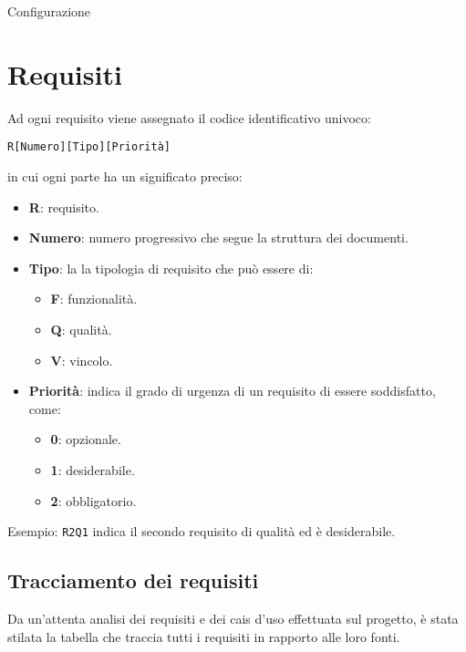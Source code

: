\begin{usecase}{1}{Configurazione}
\label{uc:scenario-principale}
\end{usecase}



\section{Requisiti}
Ad ogni requisito viene assegnato il codice identificativo univoco:
	\begin{center}
		\texttt{R[Numero][Tipo][Priorità]}
	\end{center}
	in cui ogni parte ha un significato preciso:
	\begin{itemize}
		\item \textbf{R}: requisito.
		\item \textbf{Numero}: numero progressivo che segue la struttura dei documenti.
		\item \textbf{Tipo}: la la tipologia di requisito che può essere di:
		\begin{itemize}
			\item \textbf{F}: funzionalità.
			\item \textbf{Q}: qualità.
			\item \textbf{V}: vincolo.
		\end{itemize}
		\item \textbf{Priorità}: indica il grado di urgenza di un requisito di essere soddisfatto, come:
		\begin{itemize}
			\item \textbf{0}: opzionale.
			\item \textbf{1}: desiderabile.
			\item \textbf{2}: obbligatorio.
		\end{itemize}
	\end{itemize}


	Esempio: \texttt{R2Q1} indica il secondo requisito di qualità ed è desiderabile.


\subsection{Tracciamento dei requisiti}

Da un'attenta analisi dei requisiti e dei cais d'uso effettuata sul progetto, è stata stilata la tabella che traccia tutti i requisiti in rapporto alle loro fonti.\\


